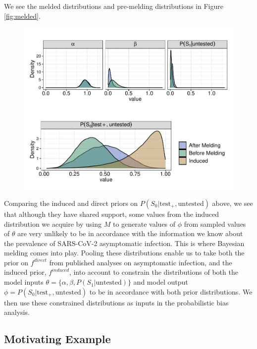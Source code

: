 \documentclass[12pt,twoside]{smiththesis}
\begin{document}
We see the melded distributions and pre-melding distributions in Figure \ref{fig:melded}.
\begin{figure}

{\centering \includegraphics[width=1\linewidth]{thesis_files/figure-latex/unnamed-chunk-12-1} 

}

\caption{\label{fig:melded}}\label{fig:unnamed-chunk-12}
\end{figure}
Comparing the induced and direct priors on \(P(S_0| \text{test}_+, \text{untested})\) above, we see that although they have shared support, some values from the induced distribution we acquire by using \(M\) to generate values of \(\phi\) from sampled values of \(\theta\) are very unlikely to be in accordance with the information we know about the prevalence of SARS-CoV-2 asymptomatic infection. This is where Bayesian melding comes into play. Pooling these distributions enable us to take both the prior on \(f^{direct}\) from published analyses on asymptomatic infection, and the induced prior, \(f^{induced}\), into account to constrain the distributions of both the model inputs \(\theta = \{ \alpha, \beta, P(S_1 | \text{untested})\}\) and model output \(\phi = P(S_0|\text{test}_+, \text{untested})\) to be in accordance with both prior distributions. We then use these constrained distributions as inputs in the probabilistic bias analysis.

\hypertarget{motivating-example}{%
\subsection{Motivating Example}\label{motivating-example}}
\end{document}
